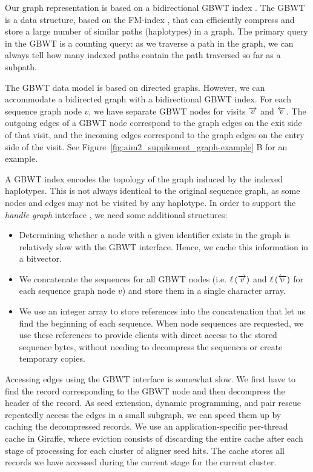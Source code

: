 \documentclass[11pt]{ucscthesis}
\newcommand{\nodelabel}[1]{\ensuremath{\ell\left( #1 \right)}}
\newcommand{\forwardnode}[1]{\ensuremath{\protect\overrightarrow{ #1 }}}
\newcommand{\reversenode}[1]{\ensuremath{\protect\overleftarrow{ #1 }}}
\newcommand{\vocab}[1]{\emph{#1}}
\begin{document}
Our graph representation is based on a bidirectional GBWT index \cite{siren_indexes_2020}.
The GBWT is a data structure, based on the FM-index \cite{Ferragina2005a}, that can efficiently compress and store a large number of similar paths (haplotypes) in a graph.
The primary query in the GBWT is a counting query: as we traverse a path in the graph, we can always tell how many indexed paths contain the path traversed so far as a subpath.

The GBWT data model is based on directed graphs.
However, we can accommodate a bidirected graph with a bidirectional GBWT index.
For each sequence graph node $v$, we have separate GBWT nodes for visits $\forwardnode{v}$ and $\reversenode{v}$.
The outgoing edges of a GBWT node correspond to the graph edges on the exit side of that visit, and the incoming edges correspond to the graph edges on the entry side of the visit.
See Figure~\ref{fig:aim2_supplement_graph-example} B for an example.

A GBWT index encodes the topology of the graph induced by the indexed haplotypes.
This is not always identical to the original sequence graph, as some nodes and edges may not be visited by any haplotype.
In order to support the \vocab{handle graph} interface \cite{eizenga2020efficient}, we need some additional structures:
\begin{itemize}

\item Determining whether a node with a given identifier exists in the graph is relatively slow with the GBWT interface.
Hence, we cache this information in a bitvector.

\item We concatenate the sequences for all GBWT nodes (i.e. $\nodelabel{\forwardnode{v}}$ and $\nodelabel{\reversenode{v}}$ for each sequence graph node $v$) and store them in a single character array.

\item We use an integer array to store references into the concatenation that let us find the beginning of each sequence. When node sequences are requested, we use these references to provide clients with direct access to the stored sequence bytes, without needing to decompress the sequences or create temporary copies.

\end{itemize}

Accessing edges using the GBWT interface is somewhat slow.
We first have to find the record corresponding to the GBWT node and then decompress the header of the record.
As seed extension, dynamic programming, and pair rescue repeatedly access the edges in a small subgraph, we can speed them up by caching the decompressed records.
We use an application-specific per-thread cache in Giraffe, where eviction consists of discarding the entire cache after each stage of processing for each cluster of aligner seed hits. The cache stores all records we have accessed during the current stage for the current cluster.
\end{document}
